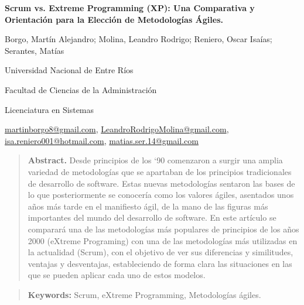 \documentclass[a4paper,10pt]{article}
\begin{document}
	\centering
	{\fontsize{14}{17}\bfseries Scrum vs. Extreme Programming (XP): Una Comparativa y Orientación para la Elección de Metodologías Ágiles.\par}
	{\small Borgo, Martín Alejandro; Molina, Leandro Rodrigo; Reniero, Oscar Isaías; Serantes, Matías\par}
	{\normalsize Universidad Nacional de Entre Ríos\par}
	{\normalsize Facultad de Ciencias de la Administración\par}
	{\normalsize Licenciatura en Sistemas\par}
	{\small \href{mailto:martinborgo8@gmail.com}{martinborgo8@gmail.com},
	\href{mailto:LeandroRodrigoMolina@gmail.com}{LeandroRodrigoMolina@gmail.com}, \href{mailto:isa.reniero001@hotmail.com}{isa.reniero001@hotmail.com},
	\href{mailto:matias.ser.14@gmail.com}{matias.ser.14@gmail.com}
	\par}	
	{\begin{quote} \small \justify\textbf{Abstract.} Desde principios de los ‘90 comenzaron a surgir una amplia variedad de metodologías que se apartaban de los principios tradicionales de desarrollo de software. Estas nuevas metodologías sentaron las bases de lo que posteriormente se conocería como los valores ágiles, asentados unos años más tarde en el manifiesto ágil, de la mano de las figuras más importantes del mundo del desarrollo de software. En este artículo se comparará una de las metodologías más populares de principios de los años 2000 (eXtreme Programing) con una de las metodologías más utilizadas en la actualidad (Scrum), con el objetivo de ver sus diferencias y similitudes, ventajas y desventajas, estableciendo de forma clara las situaciones en las que se pueden aplicar cada uno de estos modelos. \end{quote} \par}
	{\begin{quote} \small \justify\textbf{Keywords:} Scrum, eXtreme Programming, Metodologías ágiles. \end{quote} \par}
	
	\justifying
	
\end{document}
